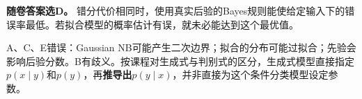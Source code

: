 \textbf{随卷答案选D。} 错分代价相同时，使用真实后验的Bayes规则能使给定输入下的错误率最低。若拟合模型的概率估计有误，就未必能达到这个最优值。


A、C、E错误：Gaussian NB可能产生二次边界；拟合的分布可能过拟合；先验会影响后验分数。B有歧义。按课程对生成式与判别式的区分，生成式模型直接指定\(p(x\mid y)\)和\(p(y)\)，再\textbf{推导出}\(p(y\mid x)\)，并非直接为这个条件分类模型设定参数。
